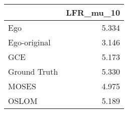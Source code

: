 \begin{tabular}{lr}
\toprule
{} & LFR_mu_10 \\
\midrule
Ego          &     5.334 \\
Ego-original &     3.146 \\
GCE          &     5.173 \\
Ground Truth &     5.330 \\
MOSES        &     4.975 \\
OSLOM        &     5.189 \\
\bottomrule
\end{tabular}
